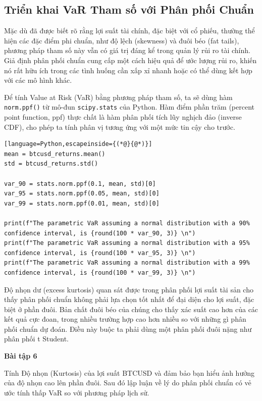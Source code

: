 \subsection{Triển khai VaR Tham số với Phân phối Chuẩn}

Mặc dù đã được biết rõ rằng lợi suất tài chính, đặc biệt với cổ phiếu, thường thể hiện các đặc điểm phi chuẩn, như độ lệch (skewness) và đuôi béo (fat tails), phương pháp tham số này vẫn có giá trị đáng kể trong quản lý rủi ro tài chính. Giả định phân phối chuẩn cung cấp một cách hiệu quả để ước lượng rủi ro, khiến nó rất hữu ích trong các tình huống cần xấp xỉ nhanh hoặc có thể dùng kết hợp với các mô hình khác.

Để tính Value at Risk (VaR) bằng phương pháp tham số, ta sẽ dùng hàm \texttt{norm.ppf()} từ mô-đun \texttt{scipy.stats} của Python. Hàm điểm phần trăm (percent point function, ppf) thực chất là hàm phân phối tích lũy nghịch đảo (inverse CDF), cho phép ta tính phân vị tương ứng với một mức tin cậy cho trước.

\begin{lstlisting}[language=Python,escapeinside={(*@}{@*)}]
mean = btcusd_returns.mean()
std = btcusd_returns.std()

var_90 = stats.norm.ppf(0.1, mean, std)[0]
var_95 = stats.norm.ppf(0.05, mean, std)[0]
var_99 = stats.norm.ppf(0.01, mean, std)[0]

print(f"The parametric VaR assuming a normal distribution with a 90% confidence interval, is {round(100 * var_90, 3)} \n")
print(f"The parametric VaR assuming a normal distribution with a 95% confidence interval, is {round(100 * var_95, 3)} \n")
print(f"The parametric VaR assuming a normal distribution with a 99% confidence interval, is {round(100 * var_99, 3)} \n")
\end{lstlisting}


Độ nhọn dư (excess kurtosis) quan sát được trong phân phối lợi suất tài sản cho thấy phân phối chuẩn không phải lựa chọn tốt nhất để đại diện cho lợi suất, đặc biệt ở phần đuôi. Bản chất đuôi béo của chúng cho thấy xác suất cao hơn của các kết quả cực đoan, trong nhiều trường hợp cao hơn nhiều so với những gì phân phối chuẩn dự đoán. Điều này buộc ta phải dùng một phân phối đuôi nặng như phân phối t Student.

\textbf{Bài tập 6}

Tính Độ nhọn (Kurtosis) của lợi suất BTCUSD và đảm bảo bạn hiểu ảnh hưởng của độ nhọn cao lên phần đuôi. Sau đó lập luận về lý do phân phối chuẩn có vẻ ước tính thấp VaR so với phương pháp lịch sử.

